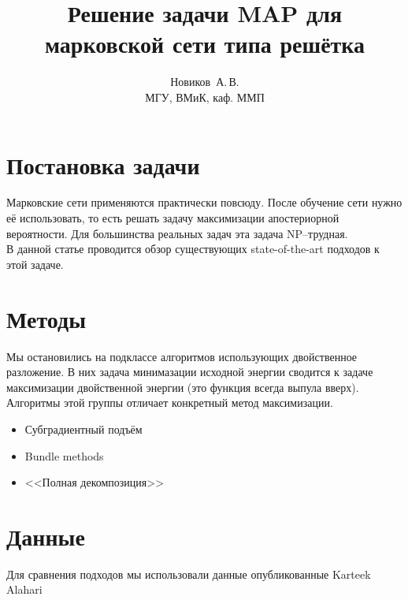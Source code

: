 \documentclass{article}
\title
    {Решение задачи MAP для марковской сети типа решётка}
\author
    {Новиков~А.\,В.\\
    МГУ, ВМиК, каф. ММП}
\begin{document}
\maketitle

\pagebreak

\section{Постановка задачи}
Марковские сети применяются практически повсюду.
После обучение сети нужно её использовать,
то есть решать задачу максимизации апостериорной вероятности.
Для большинства реальных задач эта задача NP--трудная.\\
В данной статье проводится обзор существующих
state-of-the-art подходов к этой задаче.
\pagebreak

\section{Методы}
Мы остановились на подклассе алгоритмов использующих
двойственное разложение. В них задача минимазации
исходной энергии сводится к задаче максимизации
двойственной энергии (это функция всегда выпула вверх).
Алгоритмы этой группы отличает конкретный метод максимизации.
\begin{itemize}
\item Субградиентный подъём~\cite{Subgradient}
\item Bundle methods~\cite{Bundle}
\item <<Полная декомпозиция>>
\end{itemize}
\pagebreak

\section{Данные}
Для сравнения подходов мы использовали данные
опубликованные Karteek Alahari~\cite{Alahari}
\pagebreak
\end{document}
